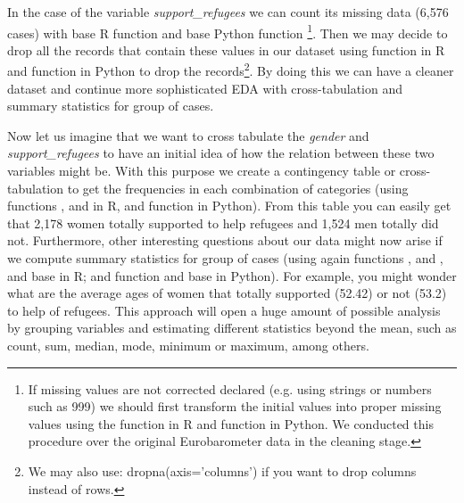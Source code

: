 In the case of the variable \textit{support\_refugees} we can count its missing data (6,576 cases) with base R function  and base Python function \footnote{If missing values are not corrected declared (e.g. using strings or numbers such as 999) we should first transform the initial values into proper missing values using the  function  in R and  function  in Python. We conducted this procedure over the original Eurobarometer data in the cleaning stage.}.  Then we may decide to drop all the records that contain these values in our dataset using  function  in R and  function  in Python to drop the records\footnote{We may also use: dropna(axis='columns') if you want to drop columns instead of rows.}. By doing this we can have a cleaner dataset and continue more sophisticated EDA with cross-tabulation and summary statistics for group of cases.	


Now let us imagine that we want to cross tabulate the \textit{gender} and \textit{support\_refugees} to have an initial idea of how the relation between these two variables might be. With this purpose we create a contingency table or cross-tabulation to get the frequencies in each combination of categories (using  functions ,  and  in R, and  function  in Python). From this table you can easily get that 2,178 women totally supported to help refugees and 1,524 men totally did not.  Furthermore, other interesting questions about our data might now arise if we compute summary statistics for group of cases (using again  functions ,  and , and base  in R; and  function  and base  in Python). For example, you might wonder what are the average ages of women that totally supported (52.42) or not (53.2) to help of refugees.  This approach will open a huge amount of possible analysis by grouping variables and estimating different statistics beyond the mean, such as count, sum, median, mode, minimum or maximum, among others.

